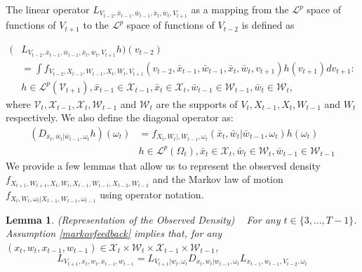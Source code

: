 \documentclass{article}
\newtheorem{lemma}{Lemma}[section]
\begin{document}
The linear operator $L_{V_{t-2},\bar{x}_{t-1},\bar{w}_{t-1},\bar{x}_{t},\bar{w}_{t}, V_{t+1}}$ as a mapping from the $\mathcal{L}^{p}$ space of functions of $V_{t+1}$ to the $\mathcal{L}^{p}$ space of functions of $V_{t-2}$ is defined as

\begin{equation}\label{operator}
    \begin{split}
     (&L_{V_{t-2},\bar{x}_{t-1},\bar{w}_{t-1},\bar{x}_{t},\bar{w}_{t}, V_{t+1}}h)(v_{t-2})\\
     &=\int f_{V_{t-2}, X_{t-1}, W_{t-1}, X_{t}, W_{t}, V_{t+1}}(v_{t-2}, \bar{x}_{t-1}, \bar{w}_{t-1}, \bar{x}_{t}, \bar{w}_{t}, v_{t+1})h(v_{t+1})dv_{t+1}:\\
     &h\in \mathcal{L}^{p}(\mathcal{V}_{t+1}), \bar{x}_{t-1}\in \mathcal{X}_{t-1}, \bar{x}_{t}\in \mathcal{X}_{t}, \bar{w}_{t-1}\in \mathcal{W}_{t-1}, \bar{w}_{t}\in \mathcal{W}_{t},
    \end{split}
\end{equation}
where $\mathcal{V}_{t}, \mathcal{X}_{t-1}, \mathcal{X}_{t}, \mathcal{W}_{t-1}$ and $\mathcal{W}_{t}$ are the supports of $V_{t}, X_{t-1}, X_{t}, W_{t-1}$ and $W_{t}$ respectively. We also define the diagonal operator as:
\begin{equation}\label{diagonal}
    \begin{split}
        (D_{\bar{x}_{t}, \bar{w}_{t}|\bar{w}_{t-1}, \omega_{t}}h)(\omega_{t})&=f_{X_{t}, W_{t}|, W_{t-1}, \omega_{t}}(\bar{x}_{t}, \bar{w}_{t}|\bar{w}_{t-1}, \omega_{t})h(\omega_{t})\\
        &h\in \mathcal{L}^{p}(\Omega_{t}), \bar{x}_{t}\in \mathcal{X}_{t}, \bar{w}_{t}\in \mathcal{W}_{t}, \bar{w}_{t-1}\in \mathcal{W}_{t-1}
    \end{split}
\end{equation}
We provide a few lemmas that allow us to represent the observed density $f_{X_{t+1}, W_{t+1}, X_{t}, W_{t}, X_{t-1}, W_{t-1}, X_{t-2}, W_{t-2}}$ and the Markov law of motion $f_{X_{t}, W_{t}, \omega_{t}|X_{t-1}, W_{t-1}, \omega_{t-1}}$ using operator notation.

\begin{lemma} (Representation of the Observed Density)
~
For any $t\in\{3,\dots, T-1\}$. Assumption \eqref{markovfeedback} implies that, for any $(x_{t}, w_{t}, x_{t-1}, w_{t-1})\in \mathcal{X}_{t}\times \mathcal{W}_{t}\times \mathcal{X}_{t-1}\times \mathcal{W}_{t-1}$,
\begin{equation}\label{obsoperator}
L_{V_{t+1},x_{t}, w_{t}, x_{t-1}, w_{t-1}}=L_{V_{t+1}|w_{t}, \omega_{t}}D_{x_{t}, w_{t}|w_{t-1}, \omega_{t}}L_{x_{t-1}, w_{t-1}, V_{t-2}, \omega_{t}}
\end{equation}
\end{lemma}
\end{document}
